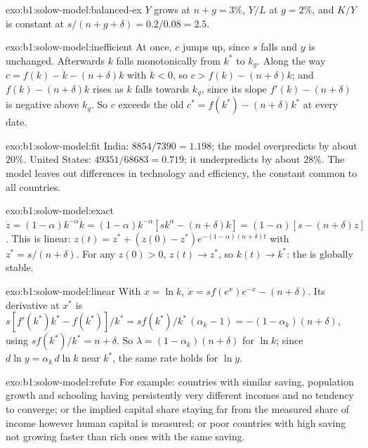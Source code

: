 \begin{solution}{exo:b1:solow-model:balanced-ex}
$Y$ grows at $n + g = 3\%$, $Y/L$ at $g = 2\%$, and $K/Y$ is constant at
$s/(n + g + \delta) = 0.2/0.08 = 2.5$.
\end{solution}

\begin{solution}{exo:b1:solow-model:inefficient}
At once, $c$ jumps up, since $s$ falls and $y$ is unchanged. Afterwards $k$ falls
monotonically from $k^*$ to $k_g$. Along the way $c = f(k) - \dot k - (n + \delta)k$ with $\dot k < 0$, so
$c > f(k) - (n + \delta)k$; and $f(k) - (n + \delta)k$ rises as $k$ falls towards $k_g$, since its slope
$f'(k) - (n + \delta)$ is negative above $k_g$. So $c$ exceeds the old $c^* = f(k^*) - (n + \delta)k^*$ at
every date.
\end{solution}

\begin{solution}{exo:b1:solow-model:fit}
India: $8854/7390 = 1.198$; the model overpredicts by about $20\%$. United
States: $49351/68683 = 0.719$; it underpredicts by about $28\%$. The model leaves
out differences in technology and efficiency, the constant common to all
countries.
\end{solution}

\begin{solution}{exo:b1:solow-model:exact}
$\dot z = (1 - \alpha)k^{-\alpha}\dot k = (1 - \alpha)k^{-\alpha}[sk^{\alpha} - (n + \delta)k] = (1 - \alpha)[s - (n + \delta)z]$. This is
linear: $z(t) = z^* + (z(0) - z^*)e^{-(1 - \alpha)(n + \delta)t}$ with $z^* = s/(n + \delta)$. For any $z(0) > 0$,
$z(t) \to z^*$, so $k(t) \to k^*$: the  is globally stable.
\end{solution}

\begin{solution}{exo:b1:solow-model:linear}
With $x = \ln k$, $\dot x = sf(e^x)e^{-x} - (n + \delta)$. Its derivative at $x^*$ is
$s[f'(k^*)k^* - f(k^*)]/k^* = s f(k^*)/k^*\,(\alpha_k - 1) = -(1 - \alpha_k)(n + \delta)$, using $sf(k^*)/k^* = n + \delta$.
So $\lambda = (1 - \alpha_k)(n + \delta)$ for $\ln k$; since $d\ln y = \alpha_k\, d\ln k$ near $k^*$, the same rate holds
for $\ln y$.
\end{solution}

\begin{solution}{exo:b1:solow-model:refute}
For example: countries with similar saving, population growth and
schooling having persistently very different incomes and no tendency to
converge; or the implied capital share staying far from the measured share
of income however human capital is measured; or poor countries with high
saving not growing faster than rich ones with the same saving.
\end{solution}

